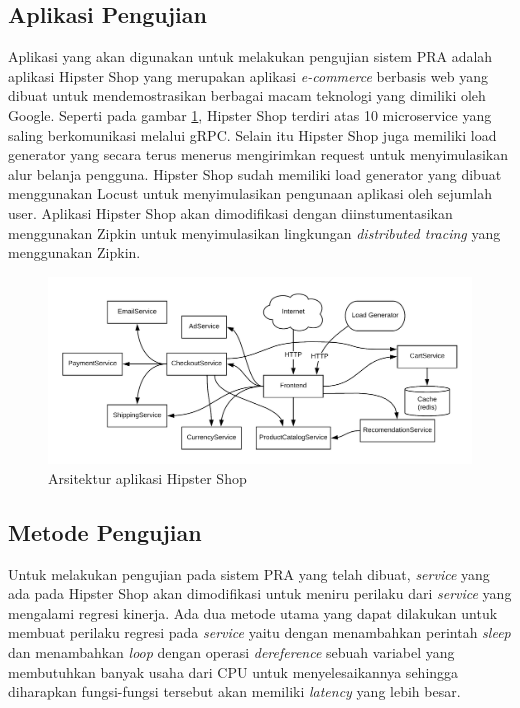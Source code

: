 \subsection{Aplikasi Pengujian}
Aplikasi yang akan digunakan untuk melakukan pengujian sistem PRA adalah aplikasi Hipster Shop yang merupakan aplikasi \textit{e-commerce} berbasis web yang dibuat untuk mendemostrasikan berbagai macam teknologi yang dimiliki oleh Google. Seperti pada gambar \ref{butiq-arch}, Hipster Shop terdiri atas 10 microservice yang saling berkomunikasi melalui gRPC. Selain itu Hipster Shop juga memiliki load generator yang secara terus menerus mengirimkan request untuk menyimulasikan alur belanja pengguna. Hipster Shop sudah memiliki load generator yang dibuat menggunakan Locust
untuk menyimulasikan pengunaan aplikasi oleh sejumlah user. Aplikasi Hipster Shop akan dimodifikasi dengan diinstumentasikan menggunakan Zipkin untuk menyimulasikan lingkungan \textit{distributed tracing} yang menggunakan Zipkin.
\begin{figure}[!htb]
	\centering
	\includegraphics[width=1\textwidth]{resources/ch4/hipster-arch.png}
	\caption{Arsitektur aplikasi Hipster Shop}
	\label{butiq-arch}
\end{figure}


\subsection{Metode Pengujian}
\label{metode-pengujian}
Untuk melakukan pengujian pada sistem PRA yang telah dibuat, \textit{service} yang ada pada Hipster Shop akan dimodifikasi untuk meniru perilaku dari \textit{service} yang mengalami regresi kinerja. Ada dua metode utama yang dapat dilakukan untuk membuat perilaku regresi pada \textit{service} yaitu dengan menambahkan perintah \textit{sleep} dan menambahkan \textit{loop} dengan operasi \textit{dereference} sebuah variabel yang membutuhkan banyak usaha dari CPU untuk menyelesaikannya sehingga diharapkan fungsi-fungsi tersebut akan memiliki \textit{latency} yang lebih besar. 

